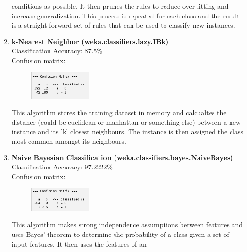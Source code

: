 \documentclass{article}
\begin{document}
\begin{enumerate}[label = (\alph*), left=10pt, itemsep=10pt]
\begin{minipage}[t]{0.9\textwidth}
            conditions as possible. It then prunes the rules to reduce over-fitting and increase generalization. This process
            is repeated for each class and the result is a straight-forward set of rules that can be used to classify new
            instances.
        \end{minipage}
        \item \begin{minipage}[t]{0.9\textwidth}
            \textbf{k-Nearest Neighbor (weka.classifiers.lazy.IBk)}\\
             Classification Accuracy: 87.5\%\\
             Confusion matrix:\\
             \begin{figure}[H]
                \includegraphics[width=0.3\textwidth, height=0.1\textheight]{./6c2.png}
            \end{figure} 
            This algorithm stores the training dataset in memory and calcualtes the distance
            (could be euclidean or manhattan or something else) between a new instance and its 'k'
            closest neighbours. The instance is then assigned the class most common amongst its neighbours. 
        \end{minipage}
        \item \begin{minipage}[t]{0.9\textwidth}
            \textbf{Naive Bayesian Classification (weka.classifiers.bayes.NaiveBayes)}\\
             Classification Accuracy: 97.2222\%\\
             Confusion matrix:\\
             \begin{figure}[H]
                \includegraphics[width=0.3\textwidth, height=0.1\textheight]{./6d2.png}
            \end{figure} 
            This algorithm makes strong independence assumptions between features and uses Bayes' theorem
            to determine the probability of a class given a set of input features. It then uses the features of an

\end{minipage}
\end{enumerate}
\end{document}

